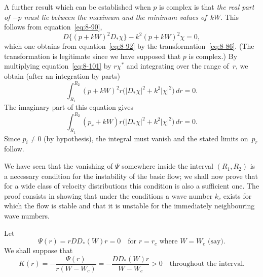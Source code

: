 A further result which can be established when $p$ is complex is that \emph{the real part of $-p$ must lie between the maximum and the minimum values of~$kW$}. This follows from equation~\eqref{eq:8-90},
\begin{equation}
\label{eq:8-101}
D\bigl\{(p+kW)^2 D_*\chi\bigr\} - k^2(p+kW)^2\chi = 0,
\end{equation}
which one obtains from equation~\eqref{eq:8-92} by the transformation~\eqref{eq:8-86}. (The transformation is legitimate since we have supposed that $p$ is complex.) By multiplying equation~\eqref{eq:8-101} by $r\chi^*$ and integrating over the range of~$r$, we obtain (after an integration by parts)
\begin{equation}
\label{eq:8-102}
\int_{R_1}^{R_2} (p+kW)^2r\bigl(|D_*\chi|^2 + k^2|\chi|^2\bigr)\,dr = 0.
\end{equation}
The imaginary part of this equation gives
\begin{equation}
\label{eq:8-103}
\int_{R_1}^{R_2} (p_r + kW)r\bigl(|D_*\chi|^2 + k^2|\chi|^2\bigr)\,dr = 0.
\end{equation}
Since $p_i \neq 0$ (by hypothesis), the integral must vanish and the stated limits on~$p_r$ follow.

We have seen that the vanishing of $\Psi$ somewhere inside the interval $(R_1, R_2)$ is a necessary condition for the instability of the basic flow; we shall now prove that for a wide class of velocity distributions this condition is also a sufficient one. The proof consists in showing that under the conditions a wave number $k_c$ exists for which the flow is stable and that it is unstable for the immediately neighbouring wave numbers.

Let
\begin{equation}
\label{eq:8-104}
\Psi(r) = rDD_*(W)r = 0 \quad \text{for } r = r_c \text{ where } W = W_c \text{ (say).}
\end{equation}
We shall suppose that
\begin{equation}
\label{eq:8-105}
K(r) = -\frac{\Psi(r)}{r(W-W_c)} = -\frac{DD_*(W)r}{W - W_c} > 0 \quad \text{throughout the interval.}
\end{equation}

